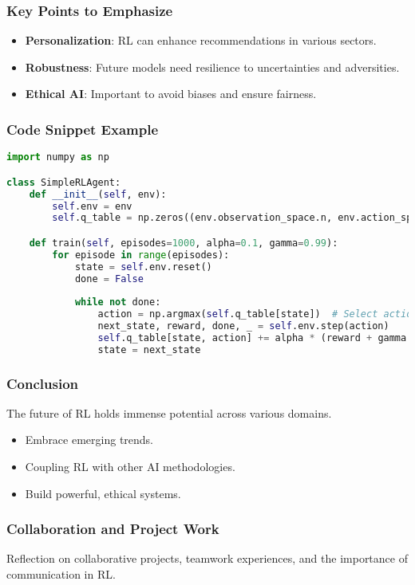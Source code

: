 \documentclass{beamer}
\begin{document}
\begin{frame}
    \frametitle{Key Points to Emphasize}
    \begin{itemize}
        \item \textbf{Personalization}: RL can enhance recommendations in various sectors.
        \item \textbf{Robustness}: Future models need resilience to uncertainties and adversities.
        \item \textbf{Ethical AI}: Important to avoid biases and ensure fairness.
    \end{itemize}
\end{frame}

\begin{frame}[fragile]
    \frametitle{Code Snippet Example}
    \begin{lstlisting}[language=Python]
import numpy as np

class SimpleRLAgent:
    def __init__(self, env):
        self.env = env
        self.q_table = np.zeros((env.observation_space.n, env.action_space.n))

    def train(self, episodes=1000, alpha=0.1, gamma=0.99):
        for episode in range(episodes):
            state = self.env.reset()
            done = False
            
            while not done:
                action = np.argmax(self.q_table[state])  # Select action with max Q-value
                next_state, reward, done, _ = self.env.step(action)
                self.q_table[state, action] += alpha * (reward + gamma * np.max(self.q_table[next_state]) - self.q_table[state, action])
                state = next_state
    \end{lstlisting}
\end{frame}

\begin{frame}
    \frametitle{Conclusion}
    The future of RL holds immense potential across various domains. 
    \begin{itemize}
        \item Embrace emerging trends.
        \item Coupling RL with other AI methodologies.
        \item Build powerful, ethical systems.
    \end{itemize}
\end{frame}

\begin{frame}[fragile]
    \frametitle{Collaboration and Project Work}
    Reflection on collaborative projects, teamwork experiences, and the importance of communication in RL.
\end{frame}
\end{document}
